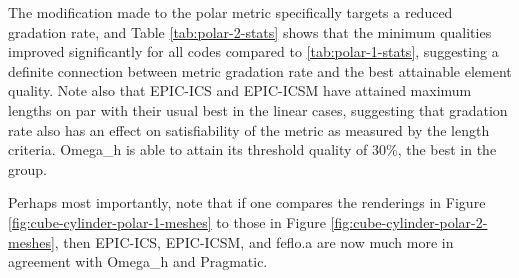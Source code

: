 \documentclass[3p,times,procedia,number]{elsarticle}
\begin{document}
The modification made to the polar metric specifically targets
a reduced gradation rate, and Table \ref{tab:polar-2-stats}
shows that the minimum qualities improved significantly for all
codes compared to \ref{tab:polar-1-stats}, suggesting a definite
connection between metric gradation rate and the best attainable
element quality.
Note also that EPIC-ICS and EPIC-ICSM have attained maximum lengths
on par with their usual best in the linear cases, suggesting that
gradation rate also has an effect on satisfiability of the metric
as measured by the length criteria.
Omega\_h is able to attain its threshold quality of 30\%, the best in the group.

Perhaps most importantly, note that if one compares the renderings
in Figure \ref{fig:cube-cylinder-polar-1-meshes} to those in
Figure \ref{fig:cube-cylinder-polar-2-meshes}, then EPIC-ICS,
EPIC-ICSM, and feflo.a are now much more in agreement with
Omega\_h and Pragmatic.
\end{document}
